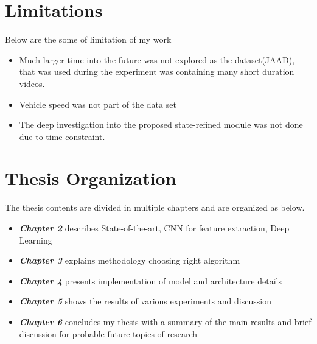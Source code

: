 \section{Limitations}
Below are the some of limitation of my work
\begin{itemize}
	\item Much larger time into the future was not explored as the dataset(JAAD), that was used during the experiment was containing many short duration videos. 

	\item Vehicle speed was not part of the data set
	\item The deep investigation into the proposed state-refined module was not done due to time constraint.
\end{itemize}

\section{Thesis Organization }
The thesis contents are divided in multiple chapters and are organized as below.
\begin{itemize}
  \item {\textbf {\textit{Chapter 2}} describes State-of-the-art, CNN for feature extraction, Deep Learning}
  \item {\textbf {\textit{Chapter 3}} explains methodology choosing right algorithm}
	\item {\textbf {\textit{Chapter 4}} presents implementation of model and architecture details  }
	\item {\textbf {\textit{Chapter 5}} shows the results of various experiments and discussion  }
	\item {\textbf {\textit{Chapter 6}} concludes my thesis with a summary of the main results and brief discussion for probable future topics of research}
\end{itemize}
